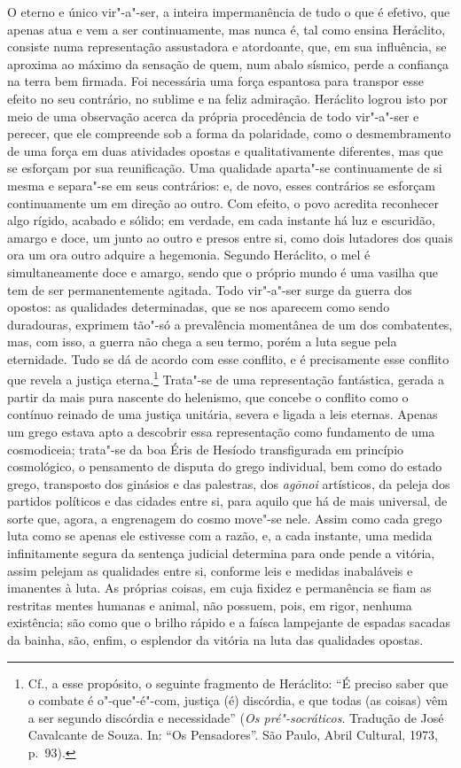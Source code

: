 O eterno e único vir"-a"-ser, a inteira impermanência de tudo o que é efetivo,
que apenas atua e vem a ser continuamente, mas nunca é, tal como ensina
Heráclito, consiste numa representação assustadora e atordoante, que, em sua
influência, se aproxima ao máximo da sensação de quem, num abalo sísmico,
perde a confiança na terra bem firmada. Foi \label{abalosismico} necessária
uma força espantosa para transpor esse efeito no seu contrário, no sublime e
na feliz admiração. Heráclito logrou isto por meio de uma observação acerca
da própria procedência de todo vir"-a"-ser e perecer, que ele compreende sob
a forma da polaridade, como o desmembramento de uma força em duas atividades
opostas e qualitativamente diferentes, mas que se esforçam por sua
reunificação. Uma qualidade aparta"-se continuamente de si mesma e separa"-se
em seus contrários: e, de novo, esses contrários se esforçam continuamente um
em direção ao outro. Com efeito, o povo acredita reconhecer algo rígido,
acabado e sólido; em verdade, em cada instante há luz e escuridão, amargo e
doce, um junto ao outro e presos entre si, como dois lutadores dos quais ora
um ora outro adquire a hegemonia. Segundo Heráclito, o mel é simultaneamente
doce e amargo, sendo que o próprio mundo é uma vasilha que tem de ser
permanentemente agitada. Todo vir"-a"-ser surge da guerra dos opostos: as
qualidades \label{guerradosopostos} determinadas, que se nos aparecem como
sendo duradouras, exprimem tão"-só a prevalência momentânea de um dos
combatentes, mas, com isso, a guerra não chega a seu termo, porém a luta
segue pela eternidade. Tudo se dá de acordo com esse conflito, e é
precisamente esse conflito que revela a justiça eterna.\footnote{Cf., a esse
propósito, o seguinte fragmento de Heráclito: ``É preciso saber que o combate
é o"-que"-é"-com, justiça (é) discórdia, e que todas (as coisas) vêm a ser
segundo discórdia e necessidade'' (\textit{Os pré"-socráticos}. Tradução de
José Cavalcante de Souza. In: ``Os Pensadores''. São Paulo, Abril Cultural,
1973, p.~93).} Trata"-se de uma representação fantástica, gerada a partir da
mais pura nascente do helenismo, que concebe o conflito como o contínuo
reinado de uma justiça unitária, severa e ligada a leis eternas. Apenas um
grego estava apto a descobrir essa representação como fundamento de uma
cosmodiceia; trata"-se da boa Éris de Hesíodo transfigurada em princípio
cosmológico, o pensamento de disputa do grego individual, bem como do estado
grego, transposto dos ginásios e das palestras, dos \textit{ag\=onoi} 
artísticos, da peleja dos partidos políticos e das cidades entre
si, para aquilo que há de mais universal, de sorte que, agora, a engrenagem
do cosmo move"-se nele. Assim como cada grego luta como se apenas ele
estivesse com a razão, e, a cada instante, uma medida infinitamente segura da
sentença judicial determina para onde pende a vitória, assim pelejam as
qualidades entre si, conforme leis e medidas inabaláveis e imanentes à luta.
As próprias coisas, em cuja fixidez e permanência se fiam as restritas mentes
humanas e animal, não possuem, pois, em rigor, nenhuma existência; são como
que o brilho rápido e a faísca lampejante de espadas sacadas da bainha, são,
enfim, o esplendor da vitória na luta das qualidades opostas.

